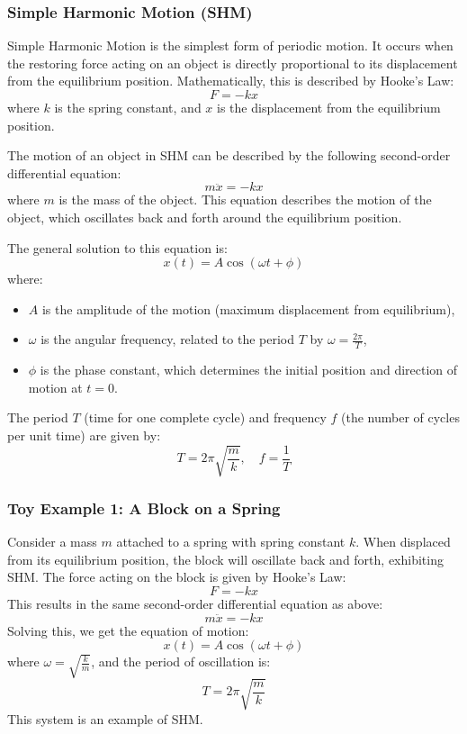 \documentclass{article}
\begin{document}
\subsubsection*{Simple Harmonic Motion (SHM)}

Simple Harmonic Motion is the simplest form of periodic motion. It occurs when the restoring force acting on an object is directly proportional to its displacement from the equilibrium position. Mathematically, this is described by Hooke's Law:
\[
F = -kx
\]
where \( k \) is the spring constant, and \( x \) is the displacement from the equilibrium position.

The motion of an object in SHM can be described by the following second-order differential equation:
\[
m \ddot{x} = -kx
\]
where \( m \) is the mass of the object. This equation describes the motion of the object, which oscillates back and forth around the equilibrium position.

The general solution to this equation is:
\[
x(t) = A \cos(\omega t + \phi)
\]
where:
\begin{itemize}
    \item \( A \) is the amplitude of the motion (maximum displacement from equilibrium),
    \item \( \omega \) is the angular frequency, related to the period \( T \) by \( \omega = \frac{2\pi}{T} \),
    \item \( \phi \) is the phase constant, which determines the initial position and direction of motion at \( t = 0 \).
\end{itemize}

The period \( T \) (time for one complete cycle) and frequency \( f \) (the number of cycles per unit time) are given by:
\[
T = 2\pi \sqrt{\frac{m}{k}}, \quad f = \frac{1}{T}
\]

\subsubsection*{Toy Example 1: A Block on a Spring}

Consider a mass \( m \) attached to a spring with spring constant \( k \). When displaced from its equilibrium position, the block will oscillate back and forth, exhibiting SHM. The force acting on the block is given by Hooke's Law:
\[
F = -kx
\]
This results in the same second-order differential equation as above:
\[
m \ddot{x} = -kx
\]
Solving this, we get the equation of motion:
\[
x(t) = A \cos(\omega t + \phi)
\]
where \( \omega = \sqrt{\frac{k}{m}} \), and the period of oscillation is:
\[
T = 2\pi \sqrt{\frac{m}{k}}
\]
This system is an example of SHM.
\end{document}

